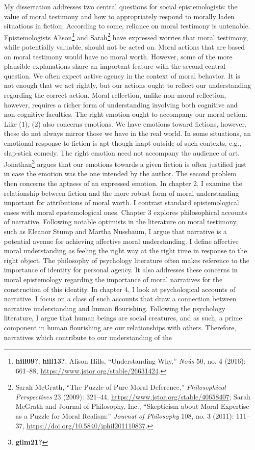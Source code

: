 \documentclass[
  12pt,
]{book}
\theoremstyle{definition}
\theoremstyle{definition}
\theoremstyle{definition}
\theoremstyle{definition}
\theoremstyle{remark}
\begin{document}
My dissertation addresses two central questions for social epistemologists: the value of moral testimony and how to appropriately respond to morally laden situations in fiction. According to some, reliance on moral testimony is untenable. Epistemologists Alison\footnote{\textbf{hill09?}; \textbf{hill13?}; Alison Hills, {``Understanding {Why},''} \emph{Noûs} 50, no. 4 (2016): 661--88, \url{https://www.jstor.org/stable/26631424}.} and Sarah\footnote{Sarah McGrath, {``The {Puzzle} of {Pure Moral Deference},''} \emph{Philosophical Perspectives} 23 (2009): 321--44, \url{https://www.jstor.org/stable/40658407}; Sarah McGrath and Journal of Philosophy, Inc., {``Skepticism about {Moral Expertise} as a {Puzzle} for {Moral Realism}:''} \emph{Journal of Philosophy} 108, no. 3 (2011): 111--37, \url{https://doi.org/10.5840/jphil201110837}.} have expressed worries that moral testimony, while potentially valuable, should not be acted on. Moral actions that are based on moral testimony would have no moral worth. However, some of the more plausible explanations share an important feature with the second central question. We often expect active agency in the context of moral behavior. It is not enough that we act rightly, but our actions ought to reflect our understanding regarding the correct action. Moral reflection, unlike non-moral reflection, however, requires a richer form of understanding involving both cognitive and non-cognitive faculties. The right emotion ought to accompany our moral action. Like (1), (2) also concerns emotions. We have emotions toward fictions, however, these do not always mirror those we have in the real world. In some situations, an emotional response to fiction is apt though inapt outside of such contexts, e.g., slap-stick comedy. The right emotion need not accompany the audience of art. Jonathan\footnote{\textbf{gilm21?}} argues that our emotions towards a given fiction is often justified just in case the emotion was the one intended by the author. The second problem then concerns the aptness of an expressed emotion. In chapter 2, I examine the relationship between fiction and the more robust form of moral understanding important for attributions of moral worth. I contrast standard epistemological cases with moral epistemological ones. Chapter 3 explores philosophical accounts of narrative. Following notable optimists in the literature on moral testimony, such as Eleanor Stump and Martha Nussbaum, I argue that narrative is a potential avenue for achieving affective moral understanding. I define affective moral understanding as feeling the right way at the right time in response to the right object. The philosophy of psychology literature often makes reference to the importance of identity for personal agency. It also addresses these concerns in moral epistemology regarding the importance of moral narratives for the construction of this identity. In chapter 4, I look at psychological accounts of narrative. I focus on a class of such accounts that draw a connection between narrative understanding and human flourishing. Following the psychology literature, I argue that human beings are social creatures, and as such, a prime component in human flourishing are our relationships with others. Therefore, narratives which contribute to our understanding of the 
\end{document}
